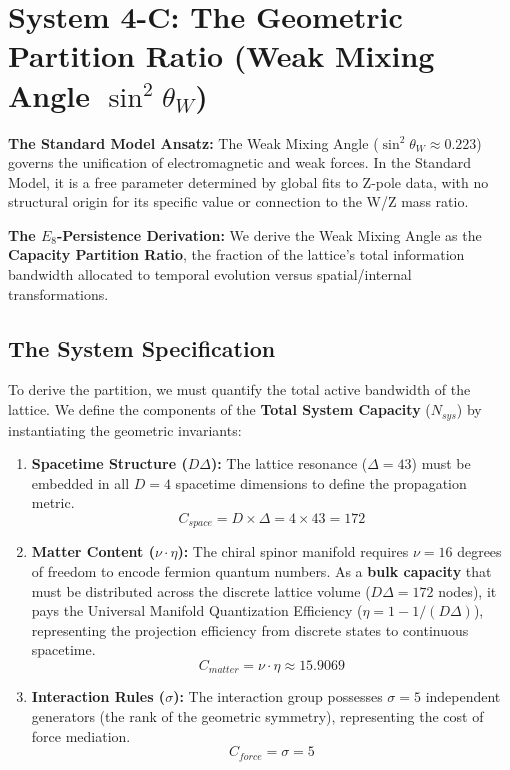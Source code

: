 \section{System 4-C: The Geometric Partition Ratio (Weak Mixing Angle \texorpdfstring{$\sin^2 \theta_W$}{sin2thetaW})}
\label{sec:Partition_Ratio}


\textbf{The Standard Model Ansatz:} The Weak Mixing Angle ($\sin^2\theta_W \approx 0.223$) governs the unification of electromagnetic and weak forces. In the Standard Model, it is a free parameter determined by global fits to Z-pole data, with no structural origin for its specific value or connection to the W/Z mass ratio.

\textbf{The $E_8$-Persistence Derivation:} We derive the Weak Mixing Angle as the \textbf{Capacity Partition Ratio}, the fraction of the lattice's total information bandwidth allocated to temporal evolution versus spatial/internal transformations.

\subsection{The System Specification}
To derive the partition, we must quantify the total active bandwidth of the lattice. We define the components of the \textbf{Total System Capacity} ($N_{sys}$) by instantiating the geometric invariants:

\begin{enumerate}
    \item \textbf{Spacetime Structure ($D\Delta$):} The lattice resonance ($\Delta=43$) must be embedded in all $D=4$ spacetime dimensions to define the propagation metric. 
    $$ C_{space} = D \times \Delta = 4 \times 43 = 172 $$
    
    \item \textbf{Matter Content ($\nu \cdot \eta$):} The chiral spinor manifold requires $\nu=16$ degrees of freedom to encode fermion quantum numbers. As a \textbf{bulk capacity} that must be distributed across the discrete lattice volume ($D\Delta = 172$ nodes), it pays the Universal Manifold Quantization Efficiency ($\eta = 1 - 1/(D\Delta)$), representing the projection efficiency from discrete states to continuous spacetime.
    $$ C_{matter} = \nu \cdot \eta \approx 15.9069 $$
    
    \item \textbf{Interaction Rules ($\sigma$):} The interaction group possesses $\sigma=5$ independent generators (the rank of the geometric symmetry), representing the cost of force mediation.
    $$ C_{force} = \sigma = 5 $$
\end{enumerate}

